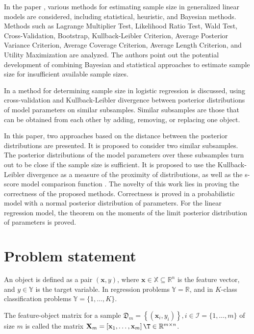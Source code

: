 \documentclass[sn-mathphys-num]{sn-jnl}%
\begin{document}
In the paper \cite{Grabovoy2022}, various methods for estimating sample size in generalized linear models are considered, including statistical, heuristic, and Bayesian methods. Methods such as Lagrange Multiplier Test, Likelihood Ratio Test, Wald Test, Cross-Validation, Bootstrap, Kullback-Leibler Criterion, Average Posterior Variance Criterion, Average Coverage Criterion, Average Length Criterion, and Utility Maximization are analyzed. The authors point out the potential development of combining Bayesian and statistical approaches to estimate sample size for insufficient available sample sizes.

In \cite{MOTRENKO2014743} a method for determining sample size in logistic regression is discussed, using cross-validation and Kullback-Leibler divergence between posterior distributions of model parameters on similar subsamples. Similar subsamples are those that can be obtained from each other by adding, removing, or replacing one object.

In this paper, two approaches based on the distance between the posterior distributions are presented. It is proposed to consider two similar subsamples. The posterior distributions of the model parameters over these subsamples turn out to be close if the sample size is sufficient. It is proposed to use the Kullback-Leibler divergence \cite{MOTRENKO2014743} as a measure of the proximity of distributions, as well as the s-score model comparison function \cite{Aduenko2017}. The novelty of this work lies in proving the correctness of the proposed methods. Correctness is proved in a probabilistic model with a normal posterior distribution of parameters. For the linear regression model, the theorem on the moments of the limit posterior distribution of parameters is proved.

\section{Problem statement}
An object is defined as a pair $(\mathbf{x}, y)$, where $\mathbf{x} \in \mathbb{X} \subseteq \mathbb{R}^n$ is the feature vector, and $y \in \mathbb{Y}$ is the target variable. In regression problems $\mathbb{Y} = \mathbb{R}$, and in $K$-class classification problems $\mathbb{Y} = \{1, \ldots, K\}$.

The feature-object matrix for a sample $\mathfrak{D}_m = \left\{ (\mathbf{x}_i, y_i) \right\}, i \in \mathcal{I} = \{ 1, \ldots, m \}$ of size $m$ is called the matrix $\mathbf{X}_m = \left[ \mathbf{x}_1, \ldots, \mathbf{x}_m \right]\T \in \mathbb{R}^{m \times n}$.
\end{document}
